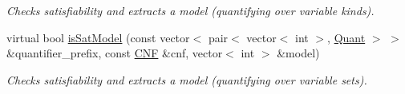 \begin{DoxyCompactItemize}
\begin{DoxyCompactList}\small\item\em Checks satisfiability and extracts a model (quantifying over variable kinds). \end{DoxyCompactList}\item 
virtual bool \hyperlink{classDepQBFApi_a4278bfb0cf01f21e9aa6333e14e4f5af}{is\-Sat\-Model} (const vector$<$ pair$<$ vector$<$ int $>$, \hyperlink{classQBFSolver_ac091e263cb55286cc07b2451bcf4d3c7}{Quant} $>$ $>$ \&quantifier\-\_\-prefix, const \hyperlink{classCNF}{C\-N\-F} \&cnf, vector$<$ int $>$ \&model)
\begin{DoxyCompactList}\small\item\em Checks satisfiability and extracts a model (quantifying over variable sets). \end{DoxyCompactList}\end{DoxyCompactItemize}
